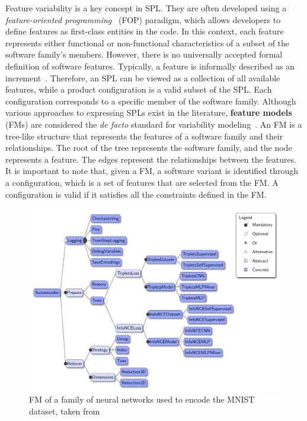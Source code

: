 Feature variability is a key concept in SPL. They are often developed using a \textit{feature-oriented programming}~\cite{Prehofer97} (FOP) paradigm, which allows developers to define features as first-class entities in the code. In this context, each feature represents either functional or non-functional characteristics of a subset of the software family's members. However, there is no universally accepted formal definition of software features. Typically, a feature is informally described as an increment~\cite{Batory21}. Therefore, an SPL can be viewed as a collection of all available features, while a product configuration is a valid subset of the SPL. Each configuration corresponds to a specific member of the software family. Although various approaches to expressing SPLs exist in the literature, \textbf{feature models}~\cite{Kang90} (FMs) are considered the \textit{de facto} standard for variability modeling~\cite{Czarnecki12}.
An FM is a tree-like structure that represents the features of a software family and their relationships. The root of the tree represents the software family, and the node represents a feature. The edges represent the relationships between the features.
It is important to note that, given a FM, a software variant is identified through a configuration, which is a set of features that are selected from the FM. A configuration is valid if it satisfies all the constraints defined in the FM.

\begin{figure}[t]
    \centering
    \includegraphics[width=0.9\linewidth]{figs/background/mnist_featuremodel.pdf}
    \caption{FM of a family of neural networks used to encode the MNIST dataset, taken from \cite{Cazzola22c}}
    \label{lst:background:featuremodel}
\end{figure}


